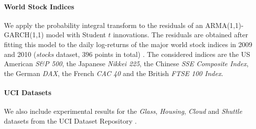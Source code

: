 \documentclass{article}
\begin{document}
\paragraph{World Stock Indices}
We apply the probability integral transform to the residuals of an
ARMA(1,1)-GARCH(1,1) model with Student $t$ innovations.  The residuals are
obtained after fitting this model to the daily log-returns of the major world stock
indices in 2009 and 2010 (\emph{stocks} dataset, 396 points in total)
\cite{rvines}.  The considered indices are the US American \emph{S\&P 500}, the
Japanese \emph{Nikkei 225}, the Chinese \emph{SSE Composite Index}, the German
\emph{DAX}, the French \emph{CAC 40} and the British \emph{FTSE 100 Index}.

\paragraph{UCI Datasets}
We also include experimental results for the \emph{Glass}, \emph{Housing},
\emph{Cloud} and \emph{Shuttle} datasets from the UCI Dataset Repository
\cite{uci}.


%
%
\end{document}
